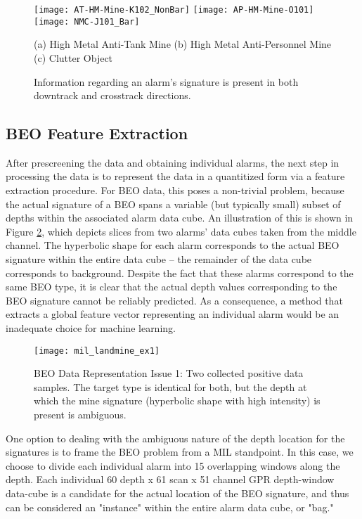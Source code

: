 \documentclass[12pt,dvips]{report}
\numberwithin{equation}{section}
\begin{document}
\begin{figure}
  \centerline{\texttt{[image: AT-HM-Mine-K102\_NonBar]} \texttt{[image: AP-HM-Mine-O101]} \texttt{[image: NMC-J101\_Bar]}}
  \centerline{(a) High Metal Anti-Tank Mine (b) High Metal Anti-Personnel Mine (c) Clutter Object}

\caption{Information regarding an alarm's signature is present in both downtrack and crosstrack directions. \label{fig:Landmine-Detection-SigDTCT}}
\end{figure}

\subsection{BEO Feature Extraction} \label{subsec:BEOFeatExt}

After prescreening the data and obtaining individual alarms, the next step in processing the data is to represent the data in a quantitized form via a feature extraction procedure.  For BEO data, this poses a non-trivial problem, because the actual signature of a BEO spans a variable (but typically small) subset of depths within the associated alarm data cube.  An illustration of this is shown in Figure \ref{fig:Landmine-Detection-Ex1_Experimental}, which depicts slices from two alarms' data cubes taken from the middle channel.  The hyperbolic shape for each alarm corresponds to the actual BEO signature within the entire data cube -- the remainder of the data cube corresponds to background.  Despite the fact that these alarms correspond to the same BEO type, it is clear that the actual depth values corresponding to the BEO signature cannot be reliably predicted.  As a consequence, a method that extracts a global feature vector representing an individual alarm would be an inadequate choice for machine learning.  

\begin{figure}
\texttt{[image: mil\_landmine\_ex1]}

\caption{BEO Data Representation Issue 1: Two collected positive data samples.  The target type is identical for both, but the depth at which the mine signature (hyperbolic shape with high intensity) is present is ambiguous.
\label{fig:Landmine-Detection-Ex1_Experimental}}
\end{figure}

One option to dealing with the ambiguous nature of the depth location for the signatures is to frame the BEO problem from a MIL standpoint.  In this case, we choose to divide each individual alarm into 15 overlapping windows along the depth.  Each individual 60 depth x 61 scan x 51 channel GPR depth-window data-cube is a candidate for the actual location of the BEO signature, and thus can be considered an "instance" within the entire alarm data cube, or "bag."  
\end{document}
